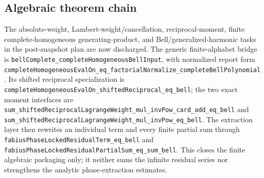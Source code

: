 \documentclass[11pt]{article}
\numberwithin{equation}{section}
\theoremstyle{definition}
\theoremstyle{remark}
\begin{document}
\subsection{Algebraic theorem chain}

The absolute-weight, Lambert-weight/cancellation, reciprocal-moment, finite
complete-homogeneous generating-product, and Bell/generalized-harmonic tasks
in the post-snapshot plan are now discharged.  The generic finite-alphabet
bridge is
\nolinkurl{bellComplete_completeHomogeneousBellInput}, with normalized
report form
\nolinkurl{completeHomogeneousEvalOn_eq_factorialNormalize_completeBellPolynomial}.
Its shifted reciprocal specialization is
\nolinkurl{completeHomogeneousEvalOn_shiftedReciprocal_eq_bell}; the two exact
moment interfaces are
\nolinkurl{sum_shiftedReciprocalLagrangeWeight_mul_invPow_card_add_eq_bell}
and \nolinkurl{sum_shiftedReciprocalLagrangeWeight_mul_invPow_eq_bell}.
The extraction layer then rewrites an individual term and every finite
partial sum through \nolinkurl{fabiusPhaseLockedResidualTerm_eq_bell} and
\nolinkurl{fabiusPhaseLockedResidualPartialSum_eq_sum_bell}.  This closes the
finite algebraic packaging only; it neither sums the infinite residual series
nor strengthens the analytic phase-extraction estimates.
\end{document}

